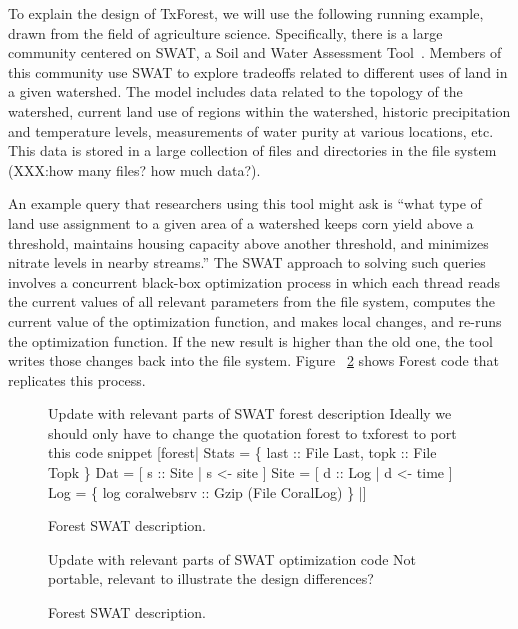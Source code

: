 To explain the design of TxForest, we will use the following running
example, drawn from the field of agriculture science.  Specifically,
there is a large community centered on SWAT, a Soil and Water
Assessment Tool~\cite{SWAT}.  Members of
this community use SWAT to explore tradeoffs related to different uses
of land in a given watershed.  The model includes data related to the
topology of the watershed, current land use of regions within the
watershed, historic precipitation and temperature levels, measurements
of water purity at various locations, etc.  This data is stored in a
large collection of files and directories in the file system (XXX:how
many files? how much data?).

An example query that researchers using this tool might ask is
``what type of land use assignment to a given area of a watershed
keeps corn yield above a threshold, maintains housing capacity above
another threshold, and minimizes nitrate levels in nearby streams.''
The SWAT approach to solving such queries involves a concurrent black-box
optimization process in which each thread reads the current values of
all relevant parameters from the file system, computes the current
value of the optimization function, and makes local changes, and re-runs
the optimization function. If the new result is higher than the old
one, the tool writes those changes back into the file system.  Figure
~\ref{fig:SWAT-opt-code} shows Forest code that replicates this process.

\begin{figure}
\begin{code}
Update with relevant parts of SWAT forest description   
Ideally we should only have to change the quotation
forest to txforest to port this code snippet
[forest|
  Stats = 
   \{ last :: File Last, topk :: File Topk \}
  Dat   = [ s :: Site | s <-  site ]
  Site  = [ d :: Log  | d <-  time ]
  Log = 
   \{ log  coralwebsrv :: Gzip (File CoralLog) \} |]
\end{code}
\caption{Forest SWAT description. }
\label{fig:SWAT-description}
\end{figure}

\begin{figure}
\begin{code}
Update with relevant parts of SWAT optimization code
Not portable, relevant to illustrate the design differences?
\end{code}
\caption{Forest SWAT description. }
\label{fig:SWAT-opt-code}
\end{figure}



